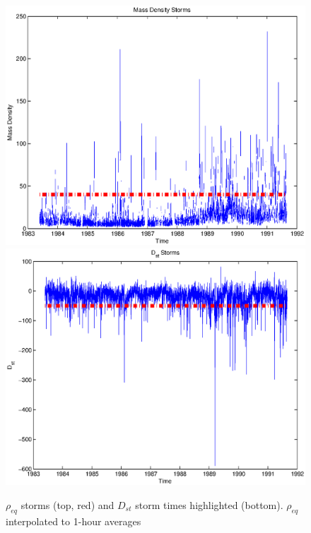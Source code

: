 \documentclass[10pt,twocolumn]{article}
\begin{document}
\begin{figure}[htp]
\centering
\includegraphics[scale=0.7]{paperfigures/massdensitystorms.eps}
\includegraphics[scale=0.7]{paperfigures/dststorms.eps}
\caption{$\rho_{eq}$ storms (top, red) and $D_{st}$ storm times highlighted (bottom). $\rho_{eq}$ interpolated to 1-hour averages}
\label{DSTstorm}
\end{figure}
\clearpage
\end{document}
